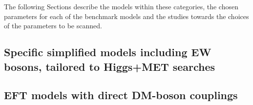 The following Sections describe the models within these categories,
the chosen parameters for each of the benchmark models
and the studies towards the choices of the parameters to be scanned.

\subsection{Specific simplified models including EW bosons, tailored to Higgs+MET searches}
\label{sec:monoHiggs}


\subsection{EFT models with direct DM-boson couplings}
\label{sec:EFT_models_with_direct_DM_boson_couplings}

